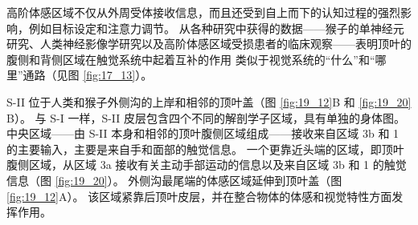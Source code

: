 高阶体感区域不仅从外周受体接收信息，而且还受到自上而下的认知过程的强烈影响，例如目标设定和注意力调节。 
从各种研究中获得的数据——猴子的单神经元研究、人类神经影像学研究以及高阶体感区域受损患者的临床观察——表明顶叶的腹侧和背侧区域在触觉系统中起着互补的作用 类似于视觉系统的“什么”和“哪里”通路（见图 \ref{fig:17_13}）。


S-II 位于人类和猴子外侧沟的上岸和相邻的顶叶盖（图 \ref{fig:19_12}B 和 \ref{fig:19_20} B）。 与 S-I 一样，S-II 皮层包含四个不同的解剖学子区域，具有单独的身体图。 
中央区域——由 S-II 本身和相邻的顶叶腹侧区域组成——接收来自区域 3b 和 1 的主要输入，主要是来自手和面部的触觉信息。 
一个更靠近头端的区域，即顶叶腹侧区域，从区域 3a 接收有关主动手部运动的信息以及来自区域 3b 和 1 的触觉信息（图 \ref{fig:19_20}）。 
外侧沟最尾端的体感区域延伸到顶叶盖（图 \ref{fig:19_12}A）。 
该区域紧靠后顶叶皮层，并在整合物体的体感和视觉特性方面发挥作用。


